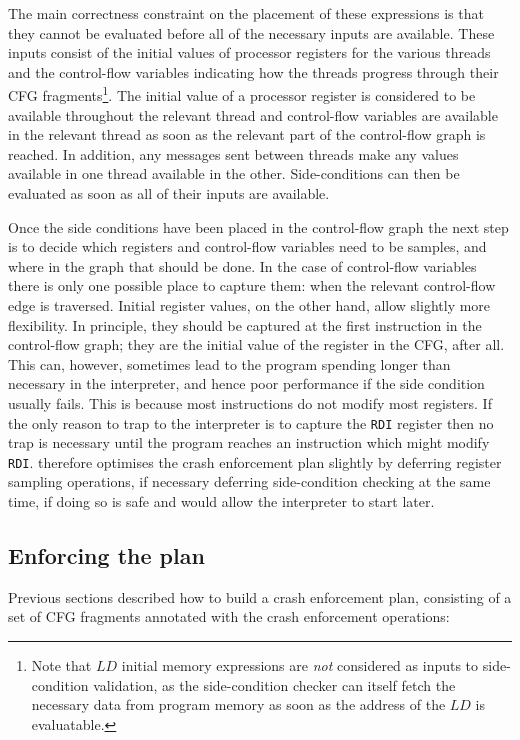 The main correctness constraint on the placement of these expressions
is that they cannot be evaluated before all of the necessary inputs
are available.  These inputs consist of the initial values of
processor registers for the various threads and the control-flow
variables indicating how the threads progress through their CFG
fragments\footnote{Note that $LD$ initial memory expressions are
  \emph{not} considered as inputs to side-condition validation, as the
  side-condition checker can itself fetch the necessary data from
  program memory as soon as the address of the $LD$ is evaluatable.}.
The initial value of a processor register is considered to be
available throughout the relevant thread and control-flow variables
are available in the relevant thread as soon as the relevant part of
the control-flow graph is reached.  In addition, any messages sent
between threads make any values available in one thread available in
the other.  Side-conditions can then be evaluated as soon as all of
their inputs are available.

Once the side conditions have been placed in the control-flow graph
the next step is to decide which registers and control-flow variables
need to be samples, and where in the graph that should be done.  In
the case of control-flow variables there is only one possible place to
capture them: when the relevant control-flow edge is traversed.
Initial register values, on the other hand, allow slightly more
flexibility.  In principle, they should be captured at the first
instruction in the control-flow graph; they are the initial value of
the register in the CFG, after all.  This can, however, sometimes lead
to the program spending longer than necessary in the interpreter, and
hence poor performance if the side condition usually fails.  This is
because most instructions do not modify most registers.  If the only
reason to trap to the interpreter is to capture the \verb|RDI|
register then no trap is necessary until the program reaches an
instruction which might modify \verb|RDI|.  {\Implementation}
therefore optimises the crash enforcement plan slightly by deferring
register sampling operations, if necessary deferring side-condition
checking at the same time, if doing so is safe and would allow the
interpreter to start later.

\subsection{Enforcing the plan}

Previous sections described how to build a crash enforcement plan,
consisting of a set of CFG fragments annotated with the crash
enforcement operations:

